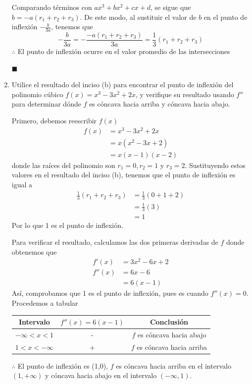 \documentclass[12pt]{article}
\begin{document}
\begin{enumerate}[label=(\alph*)]
  Comparando términos con $ax^3 + bx^2 + cx + d$, se sigue que $b=-a(r_1+r_2+r_3)$. De este modo, al sustituir el valor de $b$ en el punto de inflexión $-\frac{b}{3a}$, tenemos que
  \[
  -\frac{b}{3a}= -\frac{-a(r_1+r_2+r_3)}{3a}=\frac{1}{3}(r_1+r_2+r_3)
  \]
  $\therefore $ El punto de inflexión ocurre en el valor promedio de las intersecciones
  \begin{flushright}
    $\blacksquare$
  \end{flushright}


\item Utilice el resultado del inciso (b) para encontrar el punto de inflexión del polinomio cúbico $f(x) = x^3-3x^2 + 2x$, y verifique su resultado usando $f''$ para determinar dónde $f$ es cóncava hacia arriba y cóncava hacia abajo.

  Primero, debemos reescribir $f(x)$
  \begin{align*}
    f(x)
    &= x^3-3x^2 + 2x\\
    &=x(x^2-3x+2)\\
    &=x(x-1)(x-2)
  \end{align*}
  donde las raíces del polinomio son $r_1=0,r_2=1$ y $r_3=2$. Sustituyendo estos valores en el resultado del inciso (b), tenemos que el punto de inflexión es igual a
  \begin{align*}
    \frac{1}{3}(r_1+r_2+r_3)
    &= \frac{1}{3}(0+1+2) \\
    &= \frac{1}{3}(3) \\
    &= 1
  \end{align*}
  Por lo que 1 es el punto de inflexión.

  Para verificar el resultado, calculamos las dos primeras derivadas de $f$ donde obtenemos que
  \begin{align*}
    f'(x)
    &= 3x^2 - 6x +2\\
    f''(x)
    &= 6x -6 \\
    &= 6 (x-1)
  \end{align*}
  Así, comprobamos que 1 es el punto de inflexión, pues es cuando $f''(x)=0$. Procedemos a tabular
  \begin{table}[H]
    \centering
    \begin{tabular}{c|c|c}
      \hline
      Intervalo & $f''(x) = 6(x-1)$ & Conclusión \\
      \hline
      $-\infty<x<1$ & - & $f$ es cóncava hacia abajo \\
      $1<x<-\infty$ & + & $f$ es cóncava hacia arriba \\
      \hline
    \end{tabular}
  \end{table}
  $\therefore $ El punto de inflexión es (1,0), $f$ es cóncava hacia arriba en el intervalo $(1,+\infty)$ y cóncava hacia abajo en el intervalo $(-\infty,1)$.
  
\end{enumerate}
\end{document}
